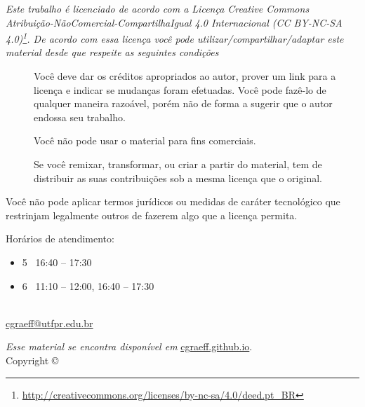 \thispagestyle{empty}
\begin{center}
\Huge\ccbyncsa
\end{center}
{\it
Este trabalho é licenciado de acordo com a Licença Creative Commons  Atribuição-NãoComercial-CompartilhaIgual 4.0 Internacional  (CC BY-NC-SA 4.0)\footnote{\url{http://creativecommons.org/licenses/by-nc-sa/4.0/deed.pt_BR}}. De acordo com essa licença você pode utilizar/compartilhar/adaptar este material desde que respeite as seguintes condições
\begin{description}
	\item[\ccAttribution]Você deve dar os créditos apropriados ao autor, prover um link para a licença e indicar se mudanças foram efetuadas. Você pode fazê-lo de qualquer maneira razoável, porém não de forma a sugerir que o autor endossa seu trabalho.

    \item[\ccNonCommercial]Você não pode usar o material para fins comerciais.

    \item[\ccShareAlike]Se você remixar, transformar, ou criar a partir do material, tem de distribuir as suas contribuições sob a mesma licença que o original.
\end{description}
Você não pode aplicar termos jurídicos ou medidas de caráter tecnológico que restrinjam legalmente outros de fazerem algo que a licença permita.
}
%
\vfill
%
\begin{fullwidth}
Horários de atendimento:
\begin{itemize}
	\item 5\textordfeminine~ 16:40 -- 17:30
	\item 6\textordfeminine~ 11:10 -- 12:00, 16:40 -- 17:30
\end{itemize}
\end{fullwidth}
%
\begin{fullwidth}
\setlength{\parindent}{0pt}
\setlength{\parskip}{\baselineskip}
\thanklessauthor\\
\url{cgraeff@utfpr.edu.br}\\
\textit{\monthyear}
\end{fullwidth}
%
\vspace{1cm}
%
\begin{fullwidth}
\par\emph{Esse material se encontra disponível em} \url{cgraeff.github.io}.\\
\noindent{}Copyright \copyright\ \the\year\ \thanklessauthor
\end{fullwidth}

